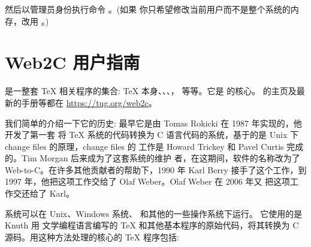 \documentclass{article}
\begin{document}
\noindent 然后以管理员身份执行命令 。(如果
你只希望修改当前用户而不是整个系统的内存，改用 。)

\section{Web2C 用户指南}

\Webc{} 是一整套 \TeX{} 相关程序的集合: \TeX{} 本身、\MF{}、\MP{}、\BibTeX{}，
等等。它是 \TL{} 的核心。\Webc{} 的主页及最新的手册等都在
\url{https://tug.org/web2c}。

我们简单的介绍一下它的历史: 最早它是由 Tomas Rokicki 在 1987 年实现的，他开发了第一套
将 \TeX{} 系统的代码转换为 C 语言代码的系统，基于的是 Unix 下 change files
的原理，change files 的
工作是 Howard Trickey 和 Pavel Curtis 完成的。Tim Morgan 后来成为了这套系统的维护
者，在这期间，软件的名称改为了 Web-to-C\@。在许多其他贡献者的帮助下，1990 年 Karl Berry
接手了这个工作，到 1997 年，他把这项工作交给了 Olaf Weber。Olaf Weber 在 2006 年又
把这项工作交还给了 Karl。

\Webc{} 系统可以在 Unix、Windows 系统、\macOS{} 和其他的一些操作系统下运行。
它使用的是 Knuth 用 \web{} 文学编程语言编写的 \TeX{} 和其他基本程序的原始代码，将其转换为 C
源码。用这种方法处理的核心的 \TeX{} 程序包括: 
\end{document}
